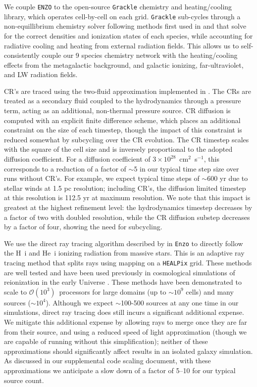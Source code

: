 \documentclass[11pt]{article}
\begin{document}
We couple \texttt{ENZO} to the open-source \texttt{Grackle} chemistry and heating/cooling library, which operates cell-by-cell on each grid. \texttt{Grackle} sub-cycles through a non-equillibrium chemistry solver following methods first used in \cite{Anninos1997} and \cite{Abel1997} that solve for the correct densities and ionization states of each species, while accounting for radiative cooling and heating from external radiation fields. This allows us to self-consistently couple our 9 species chemistry network with the heating/cooling effects from the metagalactic background, and galactic ionizing, far-ultraviolet, and LW radiation fields.

CR's are traced using the two-fluid approximation implemented in \cite{SalemBryan2014}. The CRs are treated as a secondary fluid coupled to the hydrodynamics through a pressure term, acting as an additional, non-thermal pressure source. CR diffusion is computed with an explicit finite difference scheme, which places an additional constraint on the size of each timestep, though the impact of this constraint is reduced somewhat by subcycling over the CR evolution. The CR timestep scales with the square of the cell size and is inversely proportional to the adopted diffusion coefficient. For a diffusion coefficient of $3\times10^{28}$~cm$^{2}$~s$^{-1}$, this corresponds to a reduction of a factor of $\sim$5 in our typical time step size over runs without CR's. For example, we expect typical time steps of $\sim$600 yr due to stellar winds at 1.5 pc resolution; including CR's, the diffusion limited timestep at this resolution is 112.5 yr at maximum resolution. We note that this impact is greatest at the highest refinement level: the hydrodynamics timestep decreases by a factor of two with doubled resolution, while the CR diffusion substep decreases by a factor of four, showing the need for subcycling.

We use the direct ray tracing algorithm described by \cite{WiseAbel2011} in \texttt{Enzo} to directly follow the H~{\sc i} and He~{\sc i} ionizing radiation from massive stars. This is an adaptive ray tracing method that splits rays using mapping on a \texttt{HEALPix} grid. These methods are well tested and have been used previously in cosmological simulations of reionization in the early Universe \citep{Wise2012a, WiseAbel2012,Wise2014, Kim2013a, Kim2013b}. These methods have been demonstrated to scale to $\mathcal{O}(10^{3})$~processors for large domains (up to $\sim 10^9$ cells) and many sources ($\sim10^{4}$). Although we expect $\sim$100-500 sources at any one time in our simulations, direct ray tracing does still incurs a significant additional expense. We mitigate this additional expense by allowing rays to merge once they are far from their source, and using a reduced speed of light approximation (though we are capable of running without this simplification); neither of these approximations should significantly affect results in an isolated galaxy simulation. As discussed in our supplemental code scaling document, with these approximations we anticipate a slow down of a factor of 5--10 for our typical source count.
\end{document}

